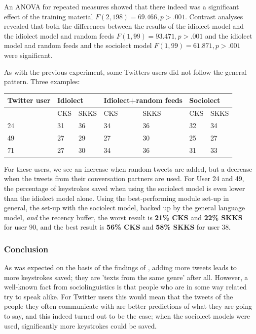 \documentclass[12pt]{article}
\let\originaltable\table
\let\endoriginaltable\endtable
\renewenvironment{table}[1][ht]{%
  \originaltable[#1]
  \centering}%
  {\endoriginaltable}
\begin{document}
An ANOVA for repeated measures showed that there indeed was a significant effect of the training material $F(2,198) = 69.466, p > .001$. Contrast analyses revealed that both the differences between the results of the idiolect model and the idiolect model and random feeds $F(1,99) = 93.471, p > .001$ and the idiolect model and random feeds and the sociolect model $F(1,99) = 61.871, p > .001$ were significant.

As with the previous experiment, some Twitters users did not follow the general pattern. Three examples:

\begin{table}[H] 
\centering
\begin{tabular}{l|llllll} 
Twitter user&\multicolumn{2}{l}{Idiolect}&\multicolumn{2}{l}{Idiolect+random feeds}&\multicolumn{2}{l}{Sociolect}\\
\hline
&CKS&SKKS&CKS&SKKS&CKS&SKKS\\
24&31&36&34&36&32&34\\
49&27&29&27&30&25&27\\
71&27&30&34&36&31&33\\
\end{tabular} 
\caption{Percentage of keystrokes saved for 3 individual Twitter users, using the the idiolect, control and sociolect models}
\end{table}

For these users, we see an increase when random tweets are added, but a decrease when the tweets from their conversation partners are used. For User 24 and 49, the percentage of keystrokes saved when using the sociolect model is even lower than the idiolect model alone.  Using the best-performing module set-up in general, the set-up with the sociolect model, backed up by the general language model, \emph{and} the recency buffer, the worst result is \textbf{21\% CKS} and \textbf{22\% SKKS} for user 90, and the best result is \textbf{56\% CKS} and \textbf{58\% SKKS} for user 38.

\subsubsection{Conclusion}
As was expected on the basis of the findings of , adding more tweets leads to more keystrokes saved; they are 'texts from the same genre' after all. However, a well-known fact from sociolinguistics is that people who are in some way related try to speak alike. For Twitter users this would mean that the tweets of the people they often communicate with are better predictions of what they are going to say, and this indeed turned out to be the case; when the sociolect models were used, significantly more keystrokes could be saved.
\end{document}
